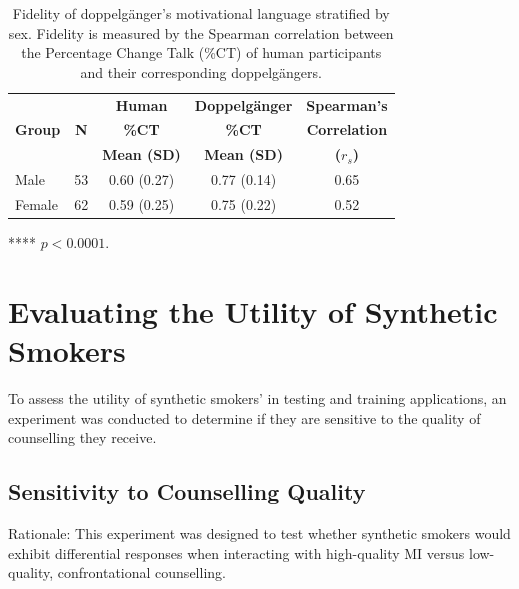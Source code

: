 \begin{table}[th!]
    \centering
    \begin{threeparttable}
        \begin{tabular}{@{}lcccc@{}}
        \toprule
        \textbf{} & \textbf{} & \textbf{Human} & \textbf{Doppelgänger} & \textbf{Spearman's} \\
        \textbf{Group} & \textbf{N} & \textbf{\%CT} & \textbf{\%CT} & \textbf{Correlation} \\
        \textbf{} & \textbf{} & \textbf{Mean (SD)} & \textbf{Mean (SD)} & \textbf{($r_s$)} \\
        \midrule
        Male & 53 & 0.60 (0.27) & 0.77 (0.14) & 0.65\tnote{****} \\
        Female & 62 & 0.59 (0.25) & 0.75 (0.22) & 0.52\tnote{****} \\
        \bottomrule
        \end{tabular}
        \begin{tablenotes}
            \item[****] \footnotesize $p < 0.0001$.
        \end{tablenotes}
    \end{threeparttable}
            \caption{Fidelity of doppelgänger's motivational language stratified by sex. Fidelity is measured by the Spearman correlation between the Percentage Change Talk (\%CT) of human participants and their corresponding doppelgängers.}
        \label{tab:doppelgänger-fidelity-sex}
\end{table}



\section{Evaluating the Utility of Synthetic Smokers}
\label{sec:synthetic-smoker-utility}

To assess the utility of synthetic smokers' in testing and training applications, an experiment was conducted to determine if they are sensitive to the quality of counselling they receive.

\subsection{Sensitivity to Counselling Quality}

Rationale: This experiment was designed to test whether synthetic smokers would exhibit differential responses when interacting with high-quality MI versus low-quality, confrontational counselling.

